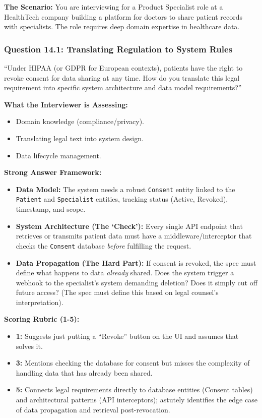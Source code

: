 \textbf{The Scenario:} You are interviewing for a Product Specialist
role at a HealthTech company building a platform for doctors to share
patient records with specialists. The role requires deep domain
expertise in healthcare data.

\subsubsection{Question 14.1: Translating Regulation to System
Rules}\label{question-14.1-translating-regulation-to-system-rules}

``Under HIPAA (or GDPR for European contexts), patients have the right
to revoke consent for data sharing at any time. How do you translate
this legal requirement into specific system architecture and data model
requirements?''

\textbf{What the Interviewer is Assessing:}

\begin{itemize}
\tightlist
\item
  Domain knowledge (compliance/privacy).
\item
  Translating legal text into system design.
\item
  Data lifecycle management.
\end{itemize}

\textbf{Strong Answer Framework:}

\begin{itemize}
\tightlist
\item
  \textbf{Data Model:} The system needs a robust \texttt{Consent} entity
  linked to the \texttt{Patient} and \texttt{Specialist} entities,
  tracking status (Active, Revoked), timestamp, and scope.
\item
  \textbf{System Architecture (The `Check'):} Every single API endpoint
  that retrieves or transmits patient data must have a
  middleware/interceptor that checks the \texttt{Consent} database
  \emph{before} fulfilling the request.
\item
  \textbf{Data Propagation (The Hard Part):} If consent is revoked, the
  spec must define what happens to data \emph{already} shared. Does the
  system trigger a webhook to the specialist's system demanding
  deletion? Does it simply cut off future access? (The spec must define
  this based on legal counsel's interpretation).
\end{itemize}

\textbf{Scoring Rubric (1-5):}

\begin{itemize}
\tightlist
\item
  \textbf{1:} Suggests just putting a ``Revoke'' button on the UI and
  assumes that solves it.
\item
  \textbf{3:} Mentions checking the database for consent but misses the
  complexity of handling data that has already been shared.
\item
  \textbf{5:} Connects legal requirements directly to database entities
  (Consent tables) and architectural patterns (API interceptors);
  astutely identifies the edge case of data propagation and retrieval
  post-revocation.
\end{itemize}

